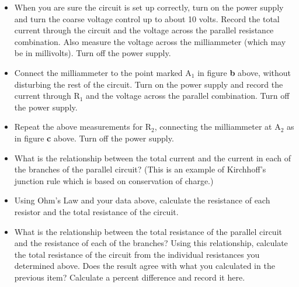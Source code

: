 \begin{itemize}
\item When you are sure the circuit is set up correctly, turn on the power 
supply and turn the coarse voltage control up to about 10 volts. Record the 
total current through the circuit and the voltage across 
the parallel resistance combination. Also measure the voltage across the 
milliammeter (which may be in millivolts). Turn off the power supply.
\vspace{20mm}

\item Connect the milliammeter to the point marked A\( _{1} \) in figure 
\textbf{b} above, without disturbing the rest of the circuit. Turn on the 
 power supply and 
record the current through R\( _{1} \) and the voltage across the parallel 
combination. Turn off the power supply.
\vspace{20mm}

\item Repeat the above measurements for R\( _{2} \), connecting the 
milliammeter at A\( _{2} \) as in figure \textbf{c} above. Turn off the 
power supply.
\vspace{20mm}


\item What is the relationship between the total current and the current
in each of the branches of the parallel circuit? (This is an example of 
Kirchhoff's junction rule which is based on conservation of charge.)
\vspace{30mm}

\item Using Ohm's Law and your data above, calculate the resistance of each 
resistor and the total resistance of the circuit.
\vspace{60mm}

\item What is the relationship between the total resistance of the parallel
circuit and the resistance of each of the branches? Using this relationship, 
calculate the total resistance of the circuit from the individual resistances 
you determined above. Does the result agree with what you calculated in the 
previous item? Calculate a percent difference and record it here.



\end{itemize}
